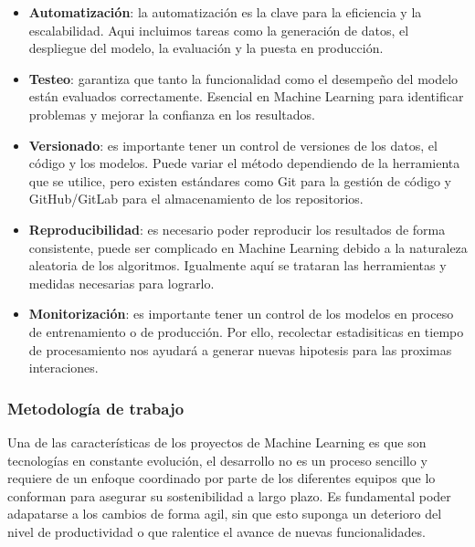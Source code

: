 \begin{itemize}
    \item \textbf{Automatización}: la automatización es la clave para la eficiencia y la escalabilidad.
          Aqui incluimos tareas como la generación de datos, el despliegue del modelo, la evaluación y
          la puesta en producción.
    \item \textbf{Testeo}: garantiza que tanto la funcionalidad como el desempeño del modelo están evaluados correctamente.
          Esencial en Machine Learning para identificar problemas y mejorar la confianza en los resultados.
    \item \textbf{Versionado}: es importante tener un control de versiones de los datos, el código y los modelos.
          Puede variar el método dependiendo de la herramienta que se utilice, pero existen estándares como Git para la gestión
          de código y GitHub/GitLab para el almacenamiento de los repositorios.
    \item \textbf{Reproducibilidad}: es necesario poder reproducir los resultados de forma consistente, puede ser
          complicado en Machine Learning debido a la naturaleza aleatoria de los algoritmos. Igualmente aquí se trataran
          las herramientas y medidas necesarias para lograrlo.
    \item \textbf{Monitorización}: es importante tener un control de los modelos en proceso de entrenamiento o de producción.
          Por ello, recolectar estadisiticas en tiempo de procesamiento nos ayudará a generar nuevas hipotesis para las proximas interaciones.
\end{itemize}

\subsubsection{Metodología de trabajo}
Una de las características de los proyectos de Machine Learning es que son tecnologías en constante evolución, el
desarrollo no es un proceso sencillo y requiere de un enfoque coordinado por parte de los diferentes
equipos que lo conforman para asegurar su sostenibilidad a largo plazo. Es fundamental poder adapatarse a los cambios
de forma agil, sin que esto suponga un deterioro del nivel de productividad o que ralentice el avance de nuevas
funcionalidades.\medskip

